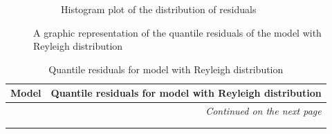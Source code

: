 \documentclass[12pt,a4paper,twoside]{article}
\begin{document}
\begin{figure}[!ht]
\begin{subfigure}{.45\textwidth}
        \caption{Histogram plot of the distribution of residuals}
        \label{fig:reyleighquantilehist}
    \end{subfigure}
    \caption{A graphic representation of the quantile residuals of the model with Reyleigh distribution}
    \label{fig:reyleighquantilefig}
\end{figure}

\begin{longtable}{l|p{}|p{}}
	\textbf{Model} & \multicolumn{2}{r}{Quantile residuals for model with Reyleigh distribution} \\
	\hline
	\endhead
	\hline
	\multicolumn{3}{r}{\emph{Continued on the next page}}    \\
	\endfoot
	\hline
	\endlastfoot
	\hline
	 &  &  \\
	 \caption{Quantile residuals for model with Reyleigh distribution}
	 \label{tab:reyleighquantiletab}
\end{longtable}
\end{document}
